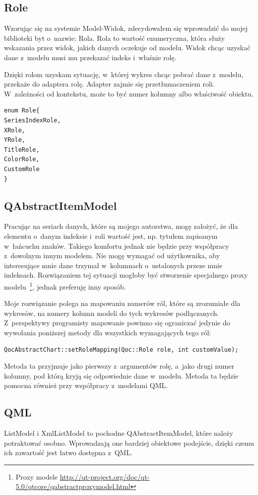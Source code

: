 \subsection{Role}
Wzorując się na systemie Model-Widok, zdecydowałem się wprowadzić do mojej biblioteki byt o~nazwie: Rola. Rola to wartość enumeryczna, która służy wskazania przez widok, jakich danych oczekuje od modelu. Widok chcąc uzyskać dane z~modelu musi mu przekazać indeks i~właśnie rolę.

Dzięki rolom uzyskam sytuację, w~której wykres chcąc pobrać dane z~modelu, przekaże do adaptera rolę. Adapter zajmie się przetłumaczeniem roli. W~zależności od kontekstu, może to być numer kolumny albo właściwość obiektu.

\begin{verbatim}
enum Role{
SeriesIndexRole,
XRole,
YRole,
TitleRole,
ColorRole,
CustomRole
}
\end{verbatim}

\subsection{QAbstractItemModel}
Pracując na seriach danych, które są mojego autorstwa, mogę założyć, że dla elementu o~danym indeksie i~roli wartość jest, np. tytułem zapisanym w~łańcuchu znaków. Takiego komfortu jednak nie będzie przy współpracy z~dowolnym innym modelem. Nie mogę wymagać od użytkownika, aby interesujące mnie dane trzymał w~kolumnach o~ustalonych przeze mnie indeksach. Rozwiązaniem tej sytuacji mogłoby być stworzenie specjalnego proxy modelu~\footnote{Proxy modele \url{http://qt-project.org/doc/qt-5.0/qtcore/qabstractproxymodel.html}}, jednak preferuję inny sposób.

Moje rozwiązanie polega na mapowaniu numerów ról, które są zrozumiałe dla wykresów, na numery kolumn modeli do tych wykresów podłączanych. Z~perspektywy programisty mapowanie powinno się ograniczać jedynie do wywołania poniższej metody dla wszystkich wymagających tego ról:

\begin{verbatim}
QocAbstractChart::setRoleMapping(Qoc::Role role, int customValue);
\end{verbatim}

Metoda ta przyjmuje jako pierwszy z~argumentów rolę, a~jako drugi numer kolumny, pod którą kryją się odpowiednie dane w~modelu. Metoda ta będzie pomocna również przy współpracy z~modelami QML.


\subsection{QML}
ListModel i XmlListModel to pochodne QAbstractItemModel, które należy potraktować osobno. Wprowadzają one bardziej obiektowe podejście, dzięki czemu ich zawartość jest łatwo dostępna z~QML.

